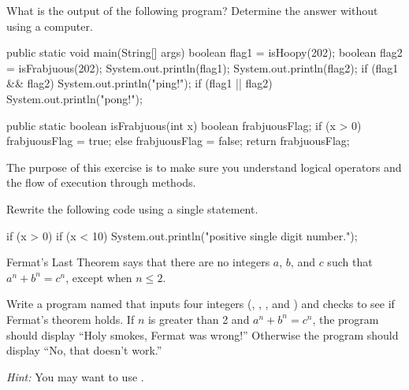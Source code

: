 \newpage
\begin{exercise}  %

What is the output of the following program?
Determine the answer without using a computer.

\begin{code}
public static void main(String[] args) {
    boolean flag1 = isHoopy(202);
    boolean flag2 = isFrabjuous(202);
    System.out.println(flag1);
    System.out.println(flag2);
    if (flag1 && flag2) {
        System.out.println("ping!");
    }
    if (flag1 || flag2) {
        System.out.println("pong!");
    }
}
\end{code}


\begin{code}
public static boolean isFrabjuous(int x) {
    boolean frabjuousFlag;
    if (x > 0) {
        frabjuousFlag = true;
    } else {
        frabjuousFlag = false;
    }
    return frabjuousFlag;
}
\end{code}

The purpose of this exercise is to make sure you understand logical operators and the flow of execution through methods.

\end{exercise}


\newpage
\begin{exercise}  %

Rewrite the following code using a single  statement.

\begin{code}
if (x > 0) {
    if (x < 10) {
        System.out.println("positive single digit number.");
    }
}
\end{code}

\end{exercise}


\begin{exercise}  %

Fermat's Last Theorem says that there are no integers $a$, $b$, and $c$ such that $a^n + b^n = c^n$, except when $n \leq 2$.

Write a program named  that inputs four integers (, , , and ) and checks to see if Fermat's theorem holds.
If $n$ is greater than 2 and $a^n + b^n = c^n$, the program should display ``Holy smokes, Fermat was wrong!''
Otherwise the program should display ``No, that doesn't work.''

{\it Hint:} You may want to use .

\end{exercise}


